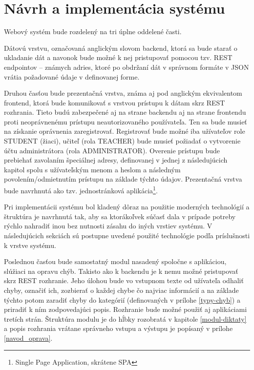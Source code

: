 \documentclass[12pt,oneside]{fithesis2}
\begin{document}
    \chapter{Návrh a implementácia systému}
    
    \par Webový systém bude rozdelený na tri úplne oddelené časti.

\par Dátovú vrstvu, označovaná anglickým slovom backend, ktorá sa bude starať o ukladanie dát a navonok bude možné k nej pristupovať pomocou tzv. REST endpointov – známych adries, ktoré po obdržaní dát v správnom formáte v JSON vrátia požadované údaje v definovanej forme.
	\par Druhou časťou bude prezentačná vrstva, známa aj pod anglickým ekvivalentom frontend, ktorá bude komunikovať s vrstvou prístupu k dátam skrz REST rozhrania. Tieto budú zabezpečené aj na strane backendu aj na strane frontendu proti neoprávnenému prístupu neautorizovaného používateľa. Ten sa bude musieť na získanie oprávnenia zaregistrovať. Registrovať bude možné iba užívateľov role STUDENT (žiaci), učiteľ (rola TEACHER) bude musieť požiadať o vytvorenie účtu administrátora (rola ADMINISTRATOR). Overenie prístupu bude prebiehať zavolaním špeciálnej adresy, definovanej v jednej z následujúcich kapitol spolu s užívateľským menom a heslom a následným povolením/odmietnutím prístupu na základe týchto údajov. Prezentačná vrstva bude navrhnutá ako tzv. jednostránková aplikácia\footnote{Single Page Application, skrátene SPA}.
	    \par Pri implementácii systému bol kladený dôraz na použitie moderných technológií a štruktúra je navrhnutá tak, aby sa ktorákoľvek súčasť dala v prípade potreby rýchlo nahradiť inou bez nutnosti zásahu do iných vrstiev systému. V následujúcich sekciách sú postupne uvedené použité technológie podľa príslušnosti k vrstve systému.
	    \par Poslednou časťou bude samostatný modul nasadený spoločne s aplikáciou, slúžiaci na opravu chýb. Takisto ako k backendu je k nemu možné pristupovať skrz REST rozhranie. Jeho úlohou bude vo vstupnom texte od užívateľa odhaliť chyby, označiť ich, zozbierať o každej chybe čo najviac informácií a na základe týchto potom zaradiť chyby do kategórií (definovaných v prílohe \ref{typy-chyb}) a priradiť k ním zodpovedajúci popis. Rozhranie bude možné použiť aj aplikáciami tretích strán. Štruktúra modulu je do hĺbky rozobratá v kapitole \ref{modul-diktaty} a popis rozhrania vrátane správneho vstupu a výstupu je popísaný v prílohe \ref{navod_oprava}.
	
\end{document}
